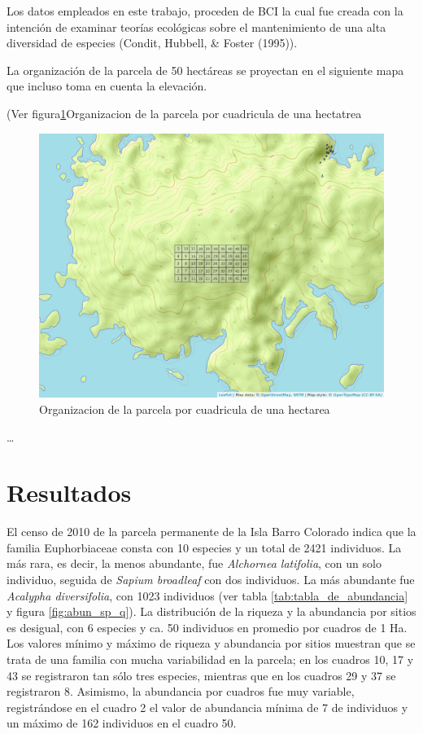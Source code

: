 \documentclass[11pt,]{article}
\begin{document}
Los datos empleados en este trabajo, proceden de BCI la cual fue creada
con la intención de examinar teorías ecológicas sobre el mantenimiento
de una alta diversidad de especies (Condit, Hubbell, \& Foster (1995)).

La organización de la parcela de 50 hectáreas se proyectan en el
siguiente mapa que incluso toma en cuenta la elevación.

(Ver figura\ref{fig:mapa_cuadros}Organizacion de la parcela por
cuadricula de una hectatrea

\begin{figure}
\centering
\includegraphics{mapa_cuadros.png}
\caption{\label{fig:mapa_cuadros}Organizacion de la parcela por
cuadricula de una hectarea}
\end{figure}

\ldots

\section{Resultados}\label{resultados}

El censo de 2010 de la parcela permanente de la Isla Barro Colorado
indica que la familia Euphorbiaceae consta con 10 especies y un total de
2421 individuos. La más rara, es decir, la menos abundante, fue
\emph{Alchornea latifolia}, con un solo individuo, seguida de
\emph{Sapium broadleaf} con dos individuos. La más abundante fue
\emph{Acalypha diversifolia}, con 1023 individuos (ver tabla
\ref{tab:tabla_de_abundancia} y figura \ref{fig:abun_sp_q}). La
distribución de la riqueza y la abundancia por sitios es desigual, con 6
especies y ca. 50 individuos en promedio por cuadros de 1 Ha. Los
valores mínimo y máximo de riqueza y abundancia por sitios muestran que
se trata de una familia con mucha variabilidad en la parcela; en los
cuadros 10, 17 y 43 se registraron tan sólo tres especies, mientras que
en los cuadros 29 y 37 se registraron 8. Asimismo, la abundancia por
cuadros fue muy variable, registrándose en el cuadro 2 el valor de
abundancia mínima de 7 de individuos y un máximo de 162 individuos en el
cuadro 50.
\end{document}
